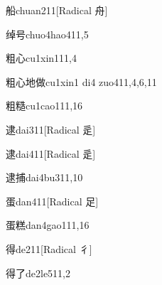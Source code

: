 \begin{verbete}{船}{chuan2}{11}[Radical ⾈]
\end{verbete}

\begin{verbete}{绰号}{chuo4hao4}{11,5}
\end{verbete}

\begin{verbete}{粗心}{cu1xin1}{11,4}
\end{verbete}

\begin{verbete}{粗心地做}{cu1xin1 di4 zuo4}{11,4,6,11}
\end{verbete}

\begin{verbete}{粗糙}{cu1cao1}{11,16}
\end{verbete}

\begin{verbete}{逮}{dai3}{11}[Radical 辵]
\end{verbete}

\begin{verbete}{逮}{dai4}{11}[Radical 辵]
\end{verbete}

\begin{verbete}{逮捕}{dai4bu3}{11,10}
\end{verbete}

\begin{verbete}{蛋}{dan4}{11}[Radical 足]
\end{verbete}

\begin{verbete}{蛋糕}{dan4gao1}{11,16}
\end{verbete}

\begin{verbete}{得}{de2}{11}[Radical 彳]
\end{verbete}

\begin{verbete}{得了}{de2le5}{11,2}
\end{verbete}

